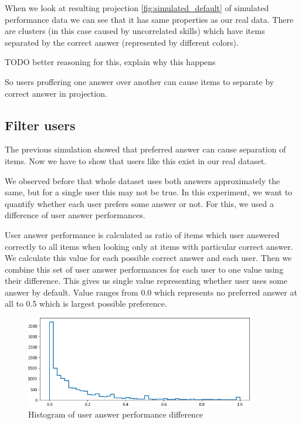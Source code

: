 \documentclass[
  digital, %
  table,   %
  nolof,     %
  nolot,     %
  nocover,
  color,
  final, %
]{fithesis3}
\begin{document}
When we look at resulting projection \ref{fig:simulated_default} of simulated performance data we can see that it has same properties as our real data. There are clusters (in this case caused by uncorrelated skills) which have items separated by the correct answer (represented by different colors).

TODO better reasoning for this, explain why this happens

So users proffering one answer over another can cause items to separate by correct answer in projection.


\subsection{Filter users}\label{filter-users}


The previous simulation showed that preferred answer can cause separation of items. Now we have to show that users like this exist in our real dataset.

We observed before that whole dataset uses both answers approximately the same, but for a single user this may not be true. In this experiment, we want to quantify whether each user prefers some answer or not. For this, we used a difference of user answer performances.

User answer performance is calculated as ratio of items which user answered correctly to all items when looking only at items with particular correct answer. We calculate this value for each possible correct answer and each user. Then we combine this set of user answer performances for each user to one value using their difference. This gives us single value representing whether user uses some answer by default. Value ranges from 0.0 which represents no preferred answer at all to 0.5 which is largest possible preference.

\begin{figure}
  \includegraphics[width=10cm]{img/uneven_answers_hist}
  \caption{Histogram of user answer performance difference}
  \label{fig:uneven_answers_hist}
\end{figure}
\end{document}
